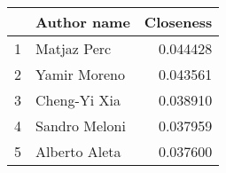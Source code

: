 \begin{tabular}{llr}
\toprule
{} &    Author name &  Closeness \\
\midrule
1 &    Matjaz Perc &   0.044428 \\
2 &   Yamir Moreno &   0.043561 \\
3 &   Cheng-Yi Xia &   0.038910 \\
4 &  Sandro Meloni &   0.037959 \\
5 &  Alberto Aleta &   0.037600 \\
\bottomrule
\end{tabular}
